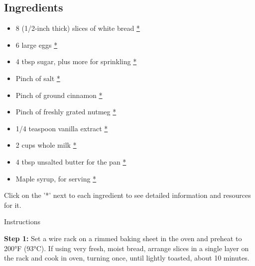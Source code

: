 \documentclass[
]{book}
\providecommand{\tightlist}{%
  \setlength{\itemsep}{0pt}\setlength{\parskip}{0pt}}
\begin{document}
\subsection*{Ingredients}\label{ingredients-1}

\begin{itemize}
\tightlist
\item
  8 (1/2-inch thick) slices of white bread
  \href{https://www.publix.com/pd/natures-own-honey-wheat-sandwich-bread-20-oz-loaf/RIO-PCI-144911?origin=search1}{*}
\item
  6 large eggs
  \href{https://www.publix.com/pd/publix-eggs-large/RIO-PCI-145492?origin=search8}{*}
\item
  4 tbsp sugar, plus more for sprinkling
  \href{https://www.publix.com/pd/publix-sugar-pure-granulated-extra-fine/RIO-PCI-143101?origin=search1}{*}
\item
  Pinch of salt
  \href{https://www.publix.com/pd/morton-salt/RIO-PCI-103677?origin=search9}{*}
\item
  Pinch of ground cinnamon
  \href{https://www.publix.com/pd/publix-cinnamon-ground/RIO-PCI-111220?origin=search1}{*}
\item
  Pinch of freshly grated nutmeg
  \href{https://www.publix.com/pd/mccormick-ground-nutmeg/RIO-PCI-110645?origin=search1}{*}
\item
  1/4 teaspoon vanilla extract
  \href{https://www.publix.com/pd/publix-vanilla-extract/RIO-PCI-110432?origin=search1}{*}
\item
  2 cups whole milk
  \href{https://www.publix.com/pd/publix-milk-whole/RIO-PCI-120772?origin=search3}{*}
\item
  4 tbsp unsalted butter for the pan
  \href{https://www.publix.com/pd/land-o-lakes-unsalted-butter-made-with-sweet-cream/RIO-PCI-112513?origin=search2}{*}
\item
  Maple syrup, for serving
  \href{https://www.publix.com/pd/pearl-milling-company-syrup-original/RIO-PCI-102438?origin=search10}{*}
\end{itemize}

Click on the '*' next to each ingredient to see detailed information and
resources for it.

Instructions

\textbf{Step 1:} Set a wire rack on a rimmed baking sheet in the oven
and preheat to 200°F (93°C). If using very fresh, moist bread, arrange
slices in a single layer on the rack and cook in oven, turning once,
until lightly toasted, about 10 minutes.
\end{document}
